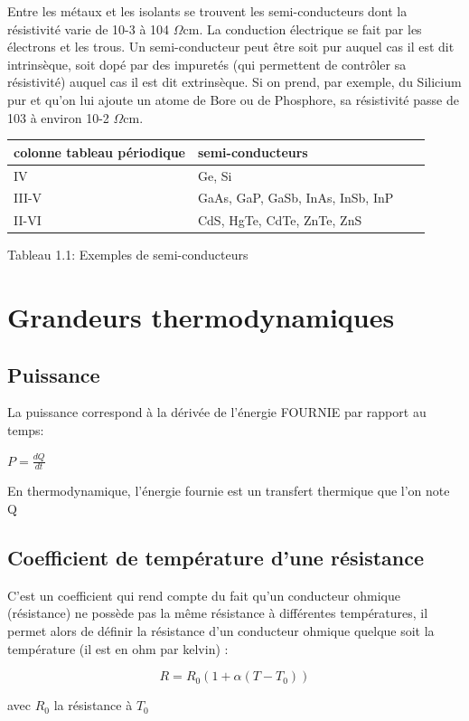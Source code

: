 \documentclass[10pt,a4paper]{report}
\begin{document}
Entre  les  métaux  et  les  isolants  se  trouvent  les  semi-conducteurs  dont  la  résistivité 
varie de 10-3 à 104 $\Omega$cm. La conduction électrique se fait par les électrons et les trous. Un semi-conducteur peut être soit pur auquel cas il est dit intrinsèque, soit dopé par des impuretés (qui permettent de contrôler sa résistivité) auquel cas il est dit extrinsèque. Si on prend, par exemple, du Silicium pur  et  qu’on  lui  ajoute  un  atome  de  Bore  ou  de Phosphore,  sa résistivité passe de 103 à environ 10-2 $\Omega$cm.
\newline
\begin{center}
\begin{tabular}{|l|p{3cm}|c|p{3cm}|}\hline
colonne tableau périodique & semi-conducteurs\\\hline
IV & Ge, Si\\\hline
III-V & GaAs, GaP, GaSb, InAs, InSb, InP\\\hline
II-VI & CdS, HgTe, CdTe, ZnTe, ZnS \\\hline
\end{tabular}
\end{center}
\begin{center}
Tableau 1.1: Exemples de semi-conducteurs
\end{center}
\section{Grandeurs thermodynamiques}
\subsection{Puissance}
La puissance correspond à la dérivée de l'énergie FOURNIE par rapport au temps:
\newline
\begin{center}
{$P=\frac{dQ}{dt}$}
\end{center}
En thermodynamique, l’énergie fournie est un transfert thermique que l'on note Q
\subsection{Coefficient de température d'une résistance}
 C’est un coefficient qui rend compte du fait qu’un conducteur ohmique (résistance) ne possède pas la même résistance à différentes températures, il permet alors de définir la résistance d’un conducteur ohmique quelque soit la température (il est en ohm par kelvin) :
\newline
\begin{center}
\begin{equation}
R=R_{0}(1+\alpha(T-T_{0}))
\end{equation}
\end{center}
\begin{center}
avec $R_{0}$ la résistance à $T_{0}$
\end{center}
\end{document}
